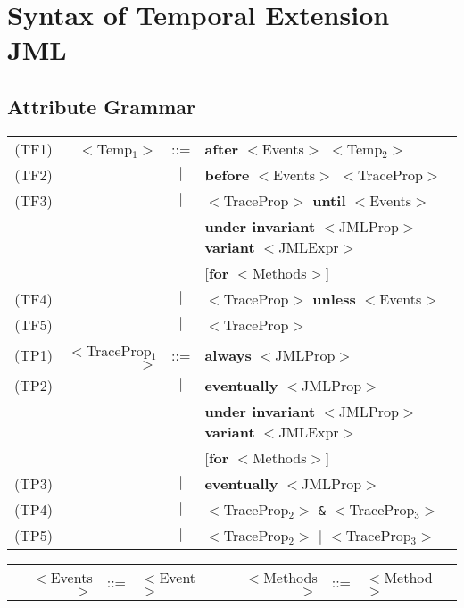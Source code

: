 \section{Syntax of Temporal Extension JML}\label{Appendix-syntax}


\subsection{Attribute Grammar}

{\small
\begin{longtable}{crcl}
\textsf{(TF1)} & $<$Temp$_1$$>$ & ::=    & 
               \textbf{after} $<$Events$>$ $<$Temp$_2$$>$\\
\textsf{(TF2)} &            & $\mid$ & 
               \textbf{before} $<$Events$>$ $<$TraceProp$>$\\ 
\textsf{(TF3)} &            & $\mid$ &
               $<$TraceProp$>$ \textbf{until} $<$Events$>$\\
&&&            \textbf{under invariant} $<$JMLProp$>$ 
               \textbf{variant} $<$JMLExpr$>$ \\
&&&            [\textbf{for} $<$Methods$>$]\\ 
\textsf{(TF4)} &              & $\mid$ &
               $<$TraceProp$>$ \textbf{unless} $<$Events$>$   \\          

\textsf{(TF5)} &              & $\mid$ & $<$TraceProp$>$ \medskip\\     

\textsf{(TP1)} & $<$TraceProp$_1$$>$ & ::= & 
               \textbf{always} $<$JMLProp$>$    \\ 
\textsf{(TP2)} &                   & $\mid$ &
               \textbf{eventually} $<$JMLProp$>$ \\                        
&&&            \textbf{under invariant} $<$JMLProp$>$ 
               \textbf{variant} $<$JMLExpr$>$ \\
&&&            [\textbf{for} $<$Methods$>$] \\
\textsf{(TP3)} &                   & $\mid$ &
               \textbf{eventually} $<$JMLProp$>$  \\                       
\textsf{(TP4)} &                   & $\mid$ &
               $<$TraceProp$_2$$>$ \texttt{\&} $<$TraceProp$_3$$>$ \\             
\textsf{(TP5)} &                   & $\mid$ &
               $<$TraceProp$_2$$>$ \texttt{$\mid$} $<$TraceProp$_3$$>$
\end{longtable}
\begin{longtable}{rclrcl}
$<$Events$>$ & ::=      & $<$Event$>$ & 
$<$Methods$>$ & ::=      & $<$Method$>$ \\


\end{longtable}}
